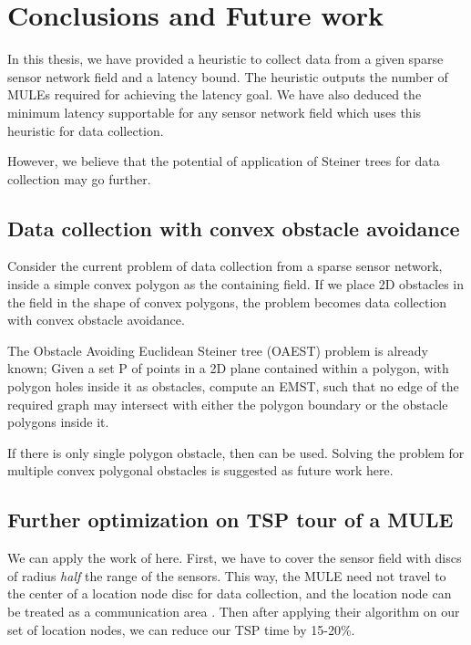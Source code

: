 \chapter{Conclusions and Future work}

In this thesis, we have provided a heuristic to collect data from a given sparse sensor network field and a latency bound. The heuristic outputs the number of MULEs required for achieving the latency goal. We have also deduced the minimum latency supportable for any sensor network field which uses this heuristic for data collection.

However, we believe that the potential of application of Steiner trees for data collection may go further.

\section{Data collection with convex obstacle avoidance}

Consider the current problem of data collection from a sparse sensor network, inside a simple convex polygon as the containing field. If we place 2D obstacles in the field in the shape of convex polygons, the problem becomes data collection with convex obstacle avoidance.

The Obstacle Avoiding Euclidean Steiner tree (OAEST) problem \cite{oaest99} is already known; Given a set P of points in a 2D plane contained within a polygon, with polygon holes inside it as obstacles, compute an EMST, such that no edge of the required graph may intersect with either the polygon boundary or the obstacle polygons inside it.

If there is only single polygon obstacle, then \cite{oatsp} can be used. Solving the problem for multiple convex polygonal obstacles is suggested as future work here.

\section{Further optimization on TSP tour of a MULE}

We can apply the work of \cite{conHull} here. First, we have to cover the sensor field with discs of radius \emph{half} the range of the sensors. This way, the MULE need not travel to the center of a location node disc for data collection, and the location node can be treated as a communication area \cite{conHull}. Then after applying their algorithm on our set of location nodes, we can reduce our TSP time by 15-20\%.

\singlespacing